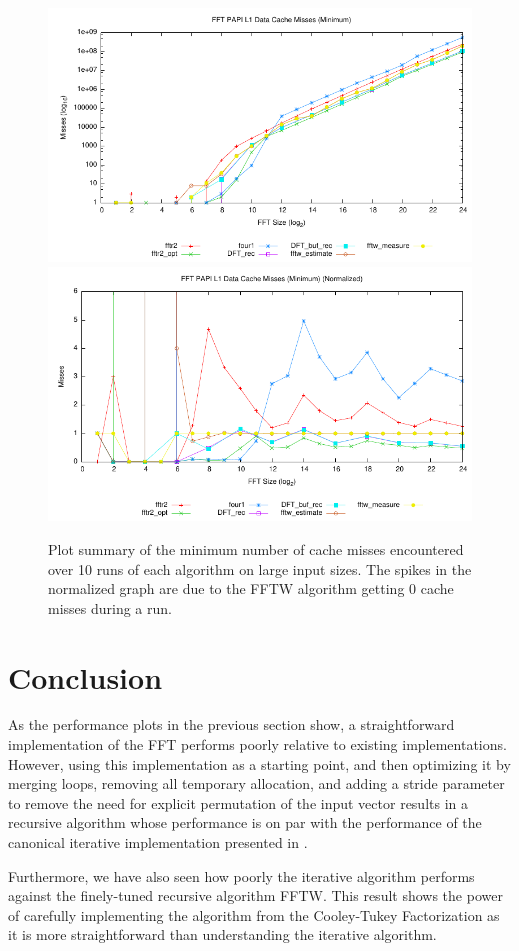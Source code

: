 \documentclass[11 pt]{article}
\begin{document}
\begin{figure}[htbp]
  \centering
	\includegraphics[width=\columnwidth]{../plots/l1dcm_min}
	\includegraphics[width=\columnwidth]{../plots/l1dcm_min_norm}
  \caption{Plot summary of the minimum number of cache misses encountered over
		10 runs of each algorithm on large input sizes. The spikes in the
		normalized graph are due to the FFTW algorithm getting 0 cache misses
		during a run.}
  \label{fig:cache_misses_min}
\end{figure}

\pagebreak

\section{Conclusion}
As the performance plots in the previous section show, a straightforward
implementation of the FFT performs poorly relative to existing implementations.
However, using this implementation as a starting point, and then optimizing it
by merging loops, removing all temporary allocation, and adding a stride 
parameter to remove the need for explicit permutation of the input vector
results in a recursive algorithm whose performance is on par with the 
performance of the canonical iterative implementation presented in 
\cite{148286}. 

Furthermore, we have also seen how poorly the iterative algorithm performs
against the finely-tuned recursive algorithm FFTW.  This result shows the power
 of carefully implementing the 
algorithm from the Cooley-Tukey Factorization as it is more straightforward
than understanding the iterative algorithm.
   


\end{document}
